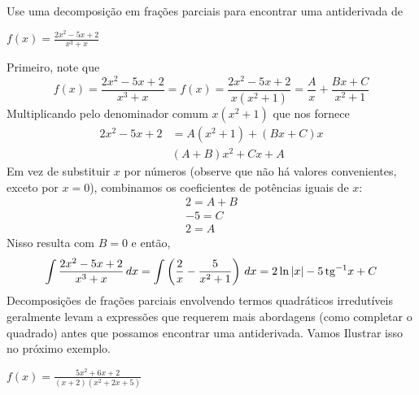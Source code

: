 \cleardoublepage\documentclass[../main.tex]{subfiles}
\begin{document}
\begin{ex}~\label{FracParcFatQuadraticos}
\\ Use uma decomposição em frações parciais para encontrar uma antiderivada de\\
\begin{compactenum}[a)]
\item $f(x)=\frac{2x^2-5x+2}{x^3+x}$

\begin{sol}
Primeiro, note que
\begin{equation*}
f(x)=\frac{2x^2-5x+2}{x^3+x}=f(x)=\frac{2x^2-5x+2}{x(x^2+1)}=\frac{A}{x}+\frac{Bx+C}{x^2+1}
\end{equation*}
Multiplicando pelo denominador comum $x(x^2+1)$ que nos fornece
\begin{align*}
2x^2-5x+2&=A(x^2+1)+(Bx+C)x\\
&(A+B)x^2+Cx+A
\end{align*}
Em vez de substituir $x$ por números (observe que não há valores convenientes, exceto por \(x = 0\)), combinamos os coeficientes de potências iguais de \(x\):
\begin{align*}
2=A+B\\
-5=C\\
2=A
\end{align*}
Nisso resulta com $B=0$ e então,
\begin{equation*}
\int \frac{2x^2-5x+2}{x^3+x}\, dx=\int \left(\frac{2}{x}-\frac{5}{x^2+1}\right)\, dx=2\ln |x|-5\operatorname{tg}\,\!\!^{-1} x+C
\end{equation*}
Decomposições de frações parciais envolvendo termos quadráticos irredutíveis geralmente levam a
expressões que requerem mais abordagens (como completar o quadrado) antes que possamos
encontrar uma antiderivada. Vamos Ilustrar isso no próximo exemplo.
\end{sol}
\item $f(x)=\frac{5x^2+6x+2}{(x+2)(x^2+2x+5)}$


\end{compactenum}
\end{ex}
\end{document}
